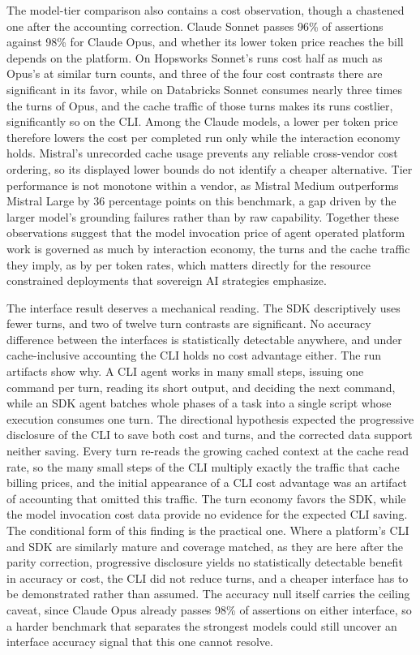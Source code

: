 \documentclass[
english,                 %
bibtex,                  %
]{kththesis}
\numberwithin{listing}{chapter}
\begin{document}
The model-tier comparison also contains a cost observation, though a chastened one after the accounting correction. Claude Sonnet passes 96\% of assertions against 98\% for Claude Opus, and whether its lower token price reaches the bill depends on the platform. On Hopsworks Sonnet's runs cost half as much as Opus's at similar turn counts, and three of the four cost contrasts there are significant in its favor, while on Databricks Sonnet consumes nearly three times the turns of Opus, and the cache traffic of those turns makes its runs costlier, significantly so on the \gls{CLI}. Among the Claude models, a lower per token price therefore lowers the cost per completed run only while the interaction economy holds. Mistral's unrecorded cache usage prevents any reliable cross-vendor cost ordering, so its displayed lower bounds do not identify a cheaper alternative. Tier performance is not monotone within a vendor, as Mistral Medium outperforms Mistral Large by 36 percentage points on this benchmark, a gap driven by the larger model's grounding failures rather than by raw capability. Together these observations suggest that the model invocation price of agent operated platform work is governed as much by interaction economy, the turns and the cache traffic they imply, as by per token rates, which matters directly for the resource constrained deployments that sovereign \gls{AI} strategies emphasize.

The interface result deserves a mechanical reading. The \gls{SDK} descriptively uses fewer turns, and two of twelve turn contrasts are significant. No accuracy difference between the interfaces is statistically detectable anywhere, and under cache-inclusive accounting the \gls{CLI} holds no cost advantage either. The run artifacts show why. A \gls{CLI} agent works in many small steps, issuing one command per turn, reading its short output, and deciding the next command, while an \gls{SDK} agent batches whole phases of a task into a single script whose execution consumes one turn. The directional hypothesis expected the progressive disclosure of the \gls{CLI} to save both cost and turns, and the corrected data support neither saving. Every turn re-reads the growing cached context at the cache read rate, so the many small steps of the \gls{CLI} multiply exactly the traffic that cache billing prices, and the initial appearance of a \gls{CLI} cost advantage was an artifact of accounting that omitted this traffic. The turn economy favors the \gls{SDK}, while the model invocation cost data provide no evidence for the expected \gls{CLI} saving. The conditional form of this finding is the practical one. Where a platform's \gls{CLI} and \gls{SDK} are similarly mature and coverage matched, as they are here after the parity correction, progressive disclosure yields no statistically detectable benefit in accuracy or cost, the \gls{CLI} did not reduce turns, and a cheaper interface has to be demonstrated rather than assumed. The accuracy null itself carries the ceiling caveat, since Claude Opus already passes 98\% of assertions on either interface, so a harder benchmark that separates the strongest models could still uncover an interface accuracy signal that this one cannot resolve.
\end{document}
